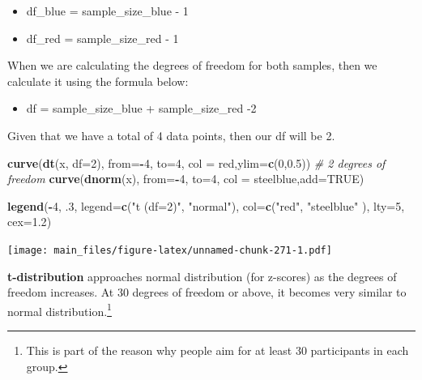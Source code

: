 \documentclass[
]{book}
\newenvironment{Shaded}{\begin{snugshade}}{\end{snugshade}}
\newcommand{\AttributeTok}[1]{\textcolor[rgb]{0.13,0.29,0.53}{#1}}
\newcommand{\CommentTok}[1]{\textcolor[rgb]{0.56,0.35,0.01}{\textit{#1}}}
\newcommand{\ConstantTok}[1]{\textcolor[rgb]{0.56,0.35,0.01}{#1}}
\newcommand{\DecValTok}[1]{\textcolor[rgb]{0.00,0.00,0.81}{#1}}
\newcommand{\FloatTok}[1]{\textcolor[rgb]{0.00,0.00,0.81}{#1}}
\newcommand{\FunctionTok}[1]{\textcolor[rgb]{0.13,0.29,0.53}{\textbf{#1}}}
\newcommand{\NormalTok}[1]{#1}
\newcommand{\SpecialCharTok}[1]{\textcolor[rgb]{0.81,0.36,0.00}{\textbf{#1}}}
\newcommand{\StringTok}[1]{\textcolor[rgb]{0.31,0.60,0.02}{#1}}
\providecommand{\tightlist}{%
  \setlength{\itemsep}{0pt}\setlength{\parskip}{0pt}}
\begin{document}
\begin{itemize}
\tightlist
\item
  df\_blue = sample\_size\_blue - 1
\item
  df\_red = sample\_size\_red - 1
\end{itemize}

When we are calculating the degrees of freedom for both samples, then we calculate it using the formula below:

\begin{itemize}
\tightlist
\item
  df = sample\_size\_blue + sample\_size\_red -2
\end{itemize}

Given that we have a total of 4 data points, then our df will be 2.

\begin{Shaded}
\begin{Highlighting}[]
\FunctionTok{curve}\NormalTok{(}\FunctionTok{dt}\NormalTok{(x, }\AttributeTok{df=}\DecValTok{2}\NormalTok{), }\AttributeTok{from=}\SpecialCharTok{{-}}\DecValTok{4}\NormalTok{, }\AttributeTok{to=}\DecValTok{4}\NormalTok{, }\AttributeTok{col =} \StringTok{\textquotesingle{}red\textquotesingle{}}\NormalTok{,}\AttributeTok{ylim=}\FunctionTok{c}\NormalTok{(}\DecValTok{0}\NormalTok{,}\FloatTok{0.5}\NormalTok{)) }\CommentTok{\# 2 degrees of freedom}
\FunctionTok{curve}\NormalTok{(}\FunctionTok{dnorm}\NormalTok{(x), }\AttributeTok{from=}\SpecialCharTok{{-}}\DecValTok{4}\NormalTok{, }\AttributeTok{to=}\DecValTok{4}\NormalTok{, }\AttributeTok{col =} \StringTok{\textquotesingle{}steelblue\textquotesingle{}}\NormalTok{,}\AttributeTok{add=}\ConstantTok{TRUE}\NormalTok{) }

\FunctionTok{legend}\NormalTok{(}\SpecialCharTok{{-}}\DecValTok{4}\NormalTok{, .}\DecValTok{3}\NormalTok{, }\AttributeTok{legend=}\FunctionTok{c}\NormalTok{(}\StringTok{"t (df=2)"}\NormalTok{, }\StringTok{"normal"}\NormalTok{),}
       \AttributeTok{col=}\FunctionTok{c}\NormalTok{(}\StringTok{"red"}\NormalTok{, }\StringTok{"steelblue"}\NormalTok{ ), }\AttributeTok{lty=}\DecValTok{5}\NormalTok{, }\AttributeTok{cex=}\FloatTok{1.2}\NormalTok{)}
\end{Highlighting}
\end{Shaded}

\texttt{[image: main\_files/figure-latex/unnamed-chunk-271-1.pdf]}

\textbf{t-distribution} approaches normal distribution (for z-scores) as the degrees of freedom increases. At 30 degrees of freedom or above, it becomes very similar to normal distribution.\footnote{This is part of the reason why people aim for at least 30 participants in each group.}
\end{document}

